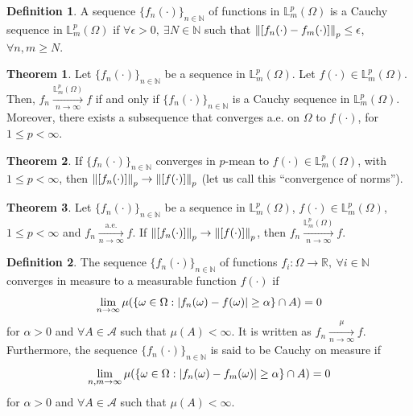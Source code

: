 \documentclass[11pt,letterpaper]{article}
\newcommand{\NN}{{\mathbb{N}}}
\newcommand{\LL}{{\mathbb{L}}}
\newcommand{\RR}{{\mathbb{R}}}
\newcommand{\A}{{\mathcal{A}}}
\let\originalleft\left
\let\originalright\right
\renewcommand{\left}{\mathopen{}\mathclose\bgroup\originalleft}
\renewcommand{\right}{\aftergroup\egroup\originalright}
\newcommand{\norm}[1]{\left\lVert#1\right\rVert}
\theoremstyle{definition}
\newtheorem{definition}{Definition}[section]
\newtheorem{theorem}{Theorem}[section]
\begin{document}
\begin{definition}
A sequence $\{f_n(\cdot)\}_{n\in\NN}$ of functions in $\LL_m^p(\Omega)$ is a Cauchy sequence in $\LL_m^p(\Omega)$ if $\forall \epsilon>0, \ \exists N\in\NN$ such that $\norm{[f_n(\cdot)-f_m(\cdot)]}_p\leq\epsilon$, $\forall n,m\geq N$.
\end{definition}
\begin{theorem}
Let $\{f_n(\cdot)\}_{n\in\NN}$ be a sequence in $\LL_m^p(\Omega)$. Let $f(\cdot)\in\LL_m^p(\Omega)$. Then, $f_n\xrightarrow[n\rightarrow\infty]{\LL_m^p(\Omega)}f$ if and only if $\{f_n(\cdot)\}_{n\in\NN}$ is a Cauchy sequence in $\LL_m^p(\Omega)$. Moreover, there exists a subsequence that converges a.e. on $\Omega$ to $f(\cdot)$, for $1\leq p<\infty$.
\end{theorem}

\begin{theorem}
If $\{f_n(\cdot)\}_{n\in\NN}$ converges in $p$-mean to $f(\cdot)\in\LL_m^p(\Omega)$, with $1\leq p<\infty$, then $\norm{[f_n(\cdot)]}_p\rightarrow\norm{[f(\cdot)]}_p$ (let us call this ``convergence of norms'').
\end{theorem}

\begin{theorem}
Let $\{f_n(\cdot)\}_{n\in\NN}$ be a sequence in $\LL_m^p(\Omega)$, $f(\cdot)\in\LL_m^p(\Omega)$, $1\leq p<\infty$ and $f_n\xrightarrow[n\rightarrow\infty]{\text{a.e.}}f$. If $\norm{[f_n(\cdot)]}_p\rightarrow\norm{[f(\cdot)]}_p$, then $f_n\xrightarrow[n\rightarrow\infty]{\LL_m^p(\Omega)}f$.
\end{theorem}

\begin{definition}
The sequence $\{f_n(\cdot)\}_{n\in\NN}$ of functions $f_i:\Omega\rightarrow\RR, \ \forall i\in\NN$ converges in measure to a measurable function $f(\cdot)$ if
\begin{equation}
\lim_{n\rightarrow\infty}\mu\left(\left\{\omega\in\Omega: \left|f_n(\omega)-f(\omega)\right|\geq\alpha\right\}\cap A\right)=0
\end{equation}
for $\alpha>0$ and $\forall A\in\A$ such that $\mu(A)<\infty$. It is written as $f_n\xrightarrow[n\rightarrow\infty]{\mu}f$. Furthermore, the sequence $\{f_n(\cdot)\}_{n\in\NN}$ is said to be Cauchy on measure if 
\begin{equation}
\lim_{n,m\rightarrow\infty}\mu\left(\left\{\omega\in\Omega: \left|f_n(\omega)-f_m(\omega)\right|\geq\alpha\right\}\cap A\right)=0
\end{equation}
for $\alpha>0$ and $\forall A\in\A$ such that $\mu(A)<\infty$.
\end{definition}
\end{document}
